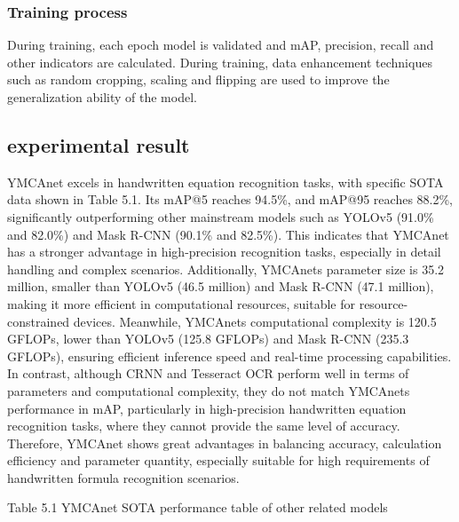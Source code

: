 \documentclass[
]{article}
\begin{document}
\subsubsection{Training process}\label{training-process}

During training, each epoch model is validated and mAP, precision,
recall and other indicators are calculated. During training, data
enhancement techniques such as random cropping, scaling and flipping are
used to improve the generalization ability of the model.

\subsection{experimental result}\label{experimental-result}

YMCAnet excels in handwritten equation recognition tasks, with specific
SOTA data shown in Table 5.1. Its mAP@5 reaches 94.5\%, and mAP@95
reaches 88.2\%, significantly outperforming other mainstream models such
as YOLOv5 (91.0\% and 82.0\%) and Mask R-CNN (90.1\% and 82.5\%). This
indicates that YMCAnet has a stronger advantage in high-precision
recognition tasks, especially in detail handling and complex scenarios.
Additionally, YMCAnet\textquotesingle s parameter size is 35.2 million,
smaller than YOLOv5 (46.5 million) and Mask R-CNN (47.1 million), making
it more efficient in computational resources, suitable for
resource-constrained devices. Meanwhile, YMCAnet\textquotesingle s
computational complexity is 120.5 GFLOPs, lower than YOLOv5 (125.8
GFLOPs) and Mask R-CNN (235.3 GFLOPs), ensuring efficient inference
speed and real-time processing capabilities. In contrast, although CRNN
and Tesseract OCR perform well in terms of parameters and computational
complexity, they do not match YMCAnet\textquotesingle s performance in
mAP, particularly in high-precision handwritten equation recognition
tasks, where they cannot provide the same level of accuracy. Therefore,
YMCAnet shows great advantages in balancing accuracy, calculation
efficiency and parameter quantity, especially suitable for high
requirements of handwritten formula recognition scenarios.

Table 5.1 YMCAnet SOTA performance table of other related models
\end{document}
